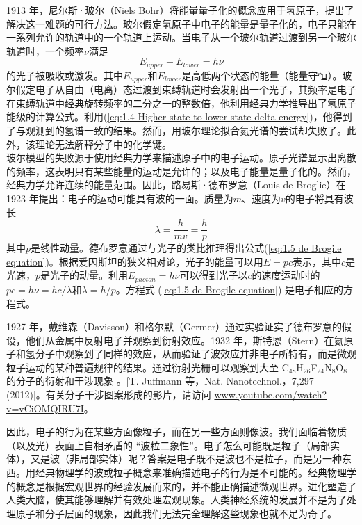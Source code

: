 	1913 年，尼尔斯·玻尔（Niels Bohr）将能量量子化的概念应用于氢原子，提出了解决这一难题的可行方法。玻尔假定氢原子中电子的能量是量子化的，电子只能在一系列允许的轨道中的一个轨道上运动。当电子从一个玻尔轨道过渡到另一个玻尔轨道时，一个频率$\nu$满足
	\begin{equation}
		\boxed{E_{upper}-E_{lower}=h\nu}
		\label{eq:1.4 Higher state to lower state delta energy}
	\end{equation}
	的光子被吸收或激发。其中$E_{upper}$和$E_{lower}$是高低两个状态的能量（能量守恒）。玻尔假定电子从自由（电离）态过渡到束缚轨道时会发射出一个光子，其频率是电子在束缚轨道中经典旋转频率的二分之一的整数倍，他利用经典力学推导出了氢原子能级的计算公式。利用(\ref{eq:1.4 Higher state to lower state delta energy})，他得到了与观测到的氢谱一致的结果。然而，用玻尔理论拟合氦光谱的尝试却失败了。此外，该理论无法解释分子中的化学键。\\
	\indent 玻尔模型的失败源于使用经典力学来描述原子中的电子运动。原子光谱显示出离散的频率，这表明只有某些能量的运动是允许的；以及电子能量是量子化的。然而，经典力学允许连续的能量范围。因此，路易斯·德布罗意（Louis de Broglie）在 1923 年提出：电子的运动可能具有波的一面。质量为$m$、速度为$v$的电子将具有波长
	\begin{equation}
		\lambda=\frac{h}{mv}=\frac{h}{p}
		\label{eq:1.5 de Brogile equation}
	\end{equation}
	其中$p$是线性动量。德布罗意通过与光子的类比推理得出公式(\ref{eq:1.5 de Brogile equation})。根据爱因斯坦的狭义相对论，光子的能量可以用$E=pc$表示，其中$c$是光速，$p$是光子的动量。利用$E_{photon}=h\nu$可以得到光子以$c$的速度运动时的$pc=h\nu =hc/\lambda$和$\lambda = h/p$。方程式 (\ref{eq:1.5 de Brogile equation}) 是电子相应的方程式。

	1927 年，戴维森（Davisson）和格尔默（Germer）通过实验证实了德布罗意的假设，他们从金属中反射电子并观察到衍射效应。1932 年，斯特恩（Stern）在氦原子和氢分子中观察到了同样的效应，从而验证了波效应并非电子所特有，而是微观粒子运动的某种普遍规律的结果。通过衍射光栅可以观察到大至 C$_{48}$H$_{26}$F$_{24}$N$_8$O$_8$的分子的衍射和干涉现象	。[T. Juffmann 等，Nat. Nanotechnol.，7,297 (2012)]。有关分子干涉图案形成的影片，请访问 \url{www.youtube.com/watch?v=vCiOMQIRU7I}。

	因此，电子的行为在某些方面像粒子，而在另一些方面则像波。我们面临着物质（以及光）表面上自相矛盾的 “波粒二象性”。电子怎么可能既是粒子（局部实体），又是波（非局部实体）呢？答案是电子既不是波也不是粒子，而是另一种东西。用经典物理学的波或粒子概念来准确描述电子的行为是不可能的。经典物理学的概念是根据宏观世界的经验发展而来的，并不能正确描述微观世界。进化塑造了人类大脑，使其能够理解并有效处理宏观现象。人类神经系统的发展并不是为了处理原子和分子层面的现象，因此我们无法完全理解这些现象也就不足为奇了。

